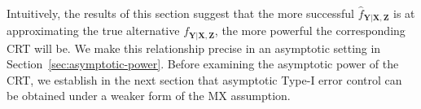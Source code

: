\documentclass[12pt]{article}
\theoremstyle{definition}
\theoremstyle{remark}
\newcommand{\prx}{\bm X}
\newcommand{\prz}{\bm Z}
\newcommand{\pry}{{\bm Y}}
\begin{document}
%

\paragraph*{}
Intuitively, the results of this section suggest that the more successful $\widehat f_{\pry|\prx,\prz}$ is at approximating the true alternative $f_{\pry|\prx,\prz}$, the more powerful the corresponding CRT will be. We make this relationship precise in an asymptotic setting in Section~\ref{sec:asymptotic-power}. Before examining the asymptotic power of the CRT, we establish in the next section that asymptotic Type-I error control can be obtained under a weaker form of the MX assumption.
\end{document}
